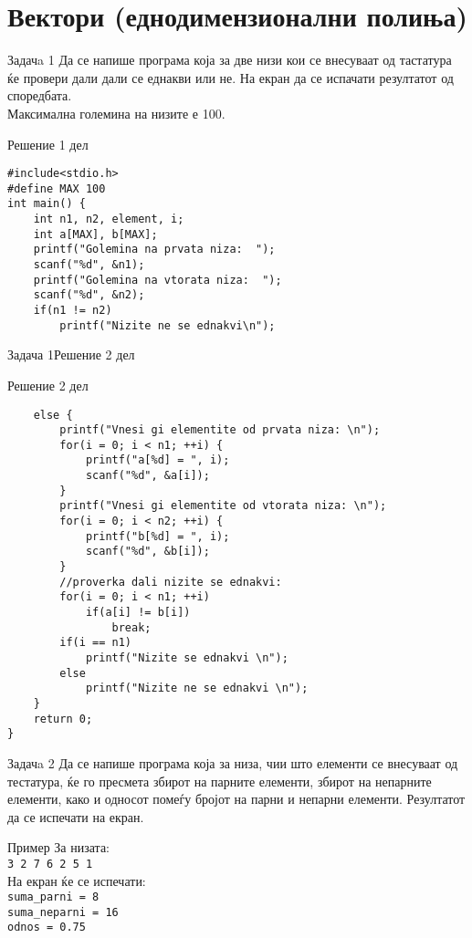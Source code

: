 
\section{Вектори (еднодимензионални полиња)}

\begin{frame}[fragile]{Задачa 1}
Да се напише програма која за две низи кои се внесуваат од тастатура ќе провери
дали дали се еднакви или не. На екран да се испачати резултатот од споредбата.\\
Максимална големина на низите е 100.
\pause
\begin{exampleblock}{Решение 1 дел}
\begin{lstlisting}
#include<stdio.h>
#define MAX 100
int main() {
    int n1, n2, element, i;
    int a[MAX], b[MAX];
    printf("Golemina na prvata niza:  ");
    scanf("%d", &n1);
    printf("Golemina na vtorata niza:  ");
    scanf("%d", &n2);
    if(n1 != n2)
        printf("Nizite ne se ednakvi\n");
\end{lstlisting}
\end{exampleblock}
\end{frame}

\begin{frame}[fragile]{Задача 1}{Решение 2 дел}
\begin{exampleblock}{Решение 2 дел}
\begin{lstlisting}
    else {
        printf("Vnesi gi elementite od prvata niza: \n");
        for(i = 0; i < n1; ++i) {
            printf("a[%d] = ", i);
            scanf("%d", &a[i]);
        }
        printf("Vnesi gi elementite od vtorata niza: \n");
        for(i = 0; i < n2; ++i) {
            printf("b[%d] = ", i);            
            scanf("%d", &b[i]);
        }
        //proverka dali nizite se ednakvi:
        for(i = 0; i < n1; ++i)
            if(a[i] != b[i])
                break;
        if(i == n1)
            printf("Nizite se ednakvi \n");
        else
            printf("Nizite ne se ednakvi \n");    
    }
    return 0;
}
\end{lstlisting}
\end{exampleblock}
\end{frame}


\begin{frame}{Задачa 2}
Да се напише програма која за низа, чии што елементи се внесуваат од тестатура, ќе го пресмета збирот на парните елементи, 
збирот на непарните елементи, како и односот помеѓу бројот на парни и непарни елементи. Резултатот да се испечати на екран.
\begin{exampleblock}{Пример}
За низата:\\
\texttt{3 {\color{red}2} 7 {\color{red}6} {\color{red}2} 5 1}\\
На екран ќе се испечати: \\
\texttt{suma\_parni = 8}\\
\texttt{suma\_neparni = 16}\\
\texttt{odnos = 0.75}
\end{exampleblock}
\end{frame}

